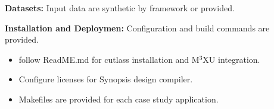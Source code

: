 \documentclass[conference]{IEEEtran}
\newcommand{\MPCMXU}[1]{M$^{3}$XU}
\begin{document}
\noindent\textbf{Datasets:} Input data are synthetic by framework or provided. 

\noindent\textbf{Installation and Deploymen:} Configuration and build commands are provided.

\artcomp
\begin{itemize}
    \item follow ReadME.md for cutlass installation and \MPCMXU{} integration.
    \item Configure licenses for Synopsis design compiler.
    \item Makefiles are provided for each case study application.
\end{itemize}





\end{document}
